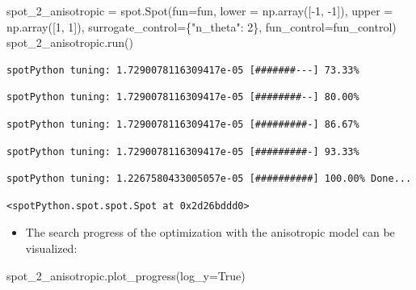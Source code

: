 \documentclass[
  letterpaper,
  DIV=11,
  numbers=noendperiod]{scrreprt}
\newenvironment{Shaded}{\begin{snugshade}}{\end{snugshade}}
\newcommand{\DecValTok}[1]{\textcolor[rgb]{0.68,0.00,0.00}{#1}}
\newcommand{\NormalTok}[1]{\textcolor[rgb]{0.00,0.23,0.31}{#1}}
\newcommand{\OperatorTok}[1]{\textcolor[rgb]{0.37,0.37,0.37}{#1}}
\newcommand{\StringTok}[1]{\textcolor[rgb]{0.13,0.47,0.30}{#1}}
\newcommand{\VariableTok}[1]{\textcolor[rgb]{0.07,0.07,0.07}{#1}}
\providecommand{\tightlist}{%
  \setlength{\itemsep}{0pt}\setlength{\parskip}{0pt}}\usepackage{longtable,booktabs,array}
\begin{document}
\begin{Shaded}
\begin{Highlighting}[]
\NormalTok{spot\_2\_anisotropic }\OperatorTok{=}\NormalTok{ spot.Spot(fun}\OperatorTok{=}\NormalTok{fun,}
\NormalTok{                   lower }\OperatorTok{=}\NormalTok{ np.array([}\OperatorTok{{-}}\DecValTok{1}\NormalTok{, }\OperatorTok{{-}}\DecValTok{1}\NormalTok{]),}
\NormalTok{                   upper }\OperatorTok{=}\NormalTok{ np.array([}\DecValTok{1}\NormalTok{, }\DecValTok{1}\NormalTok{]),}
\NormalTok{                   surrogate\_control}\OperatorTok{=}\NormalTok{\{}\StringTok{"n\_theta"}\NormalTok{: }\DecValTok{2}\NormalTok{\},}
\NormalTok{                   fun\_control}\OperatorTok{=}\NormalTok{fun\_control)}
\NormalTok{spot\_2\_anisotropic.run()}
\end{Highlighting}
\end{Shaded}

\begin{verbatim}
spotPython tuning: 1.7290078116309417e-05 [#######---] 73.33% 
\end{verbatim}

\begin{verbatim}
spotPython tuning: 1.7290078116309417e-05 [########--] 80.00% 
\end{verbatim}

\begin{verbatim}
spotPython tuning: 1.7290078116309417e-05 [#########-] 86.67% 
\end{verbatim}

\begin{verbatim}
spotPython tuning: 1.7290078116309417e-05 [#########-] 93.33% 
\end{verbatim}

\begin{verbatim}
spotPython tuning: 1.2267580433005057e-05 [##########] 100.00% Done...
\end{verbatim}

\begin{verbatim}
<spotPython.spot.spot.Spot at 0x2d26bddd0>
\end{verbatim}

\begin{itemize}
\tightlist
\item
  The search progress of the optimization with the anisotropic model can
  be visualized:
\end{itemize}

\begin{Shaded}
\begin{Highlighting}[]
\NormalTok{spot\_2\_anisotropic.plot\_progress(log\_y}\OperatorTok{=}\VariableTok{True}\NormalTok{)}
\end{Highlighting}
\end{Shaded}
\end{document}
